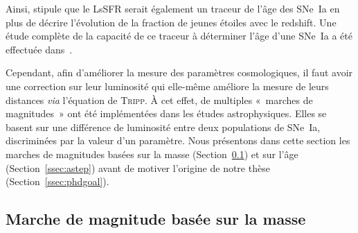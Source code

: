 \documentclass[../main/main.tex]{subfiles}
\begin{document}
Ainsi, \cite{rigault2020} stipule que le LsSFR serait également un traceur de
l'âge des SNe~Ia en plus de décrire l'évolution de la fraction de jeunes étoiles
avec le redshift. Une étude complète de la capacité de ce traceur à déterminer
l'âge d'une SNe~Ia a été effectuée dans~\cite{briday2021, briday2022}.

Cependant, afin d'améliorer la mesure des paramètres cosmologiques, il faut
avoir une correction sur leur luminosité qui elle-même améliore la mesure de
leurs distances \textit{via} l'équation de \textsc{Tripp}. À cet effet, de
multiples «~marches de magnitudes~» ont été implémentées dans les études
astrophysiques. Elles se basent sur une différence de luminosité entre deux
populations de SNe~Ia, discriminées par la valeur d'un paramètre. Nous
présentons dans cette section les marches de magnitudes basées sur la masse
(Section~\ref{ssec:mstep}) et sur l'âge (Section~\ref{ssec:astep}) avant de
motiver l'origine de notre thèse (Section~\ref{ssec:phdgoal}).


% 
% 
% 

\subsection{Marche de magnitude basée sur la masse}\label{ssec:mstep}
\end{document}
